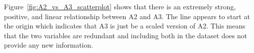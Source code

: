 \documentclass[11pt]{report}
\begin{document}
Figure~\ref{fig:A2_vs_A3_scatterplot} shows that there is an extremely strong, positive, and linear relationship between A2 and A3. The line appears to start at the origin which indicates that A3 is just be a scaled version of A2. This means that the two variables are redundant and including both in the dataset does not provide any new information.
\end{document}
